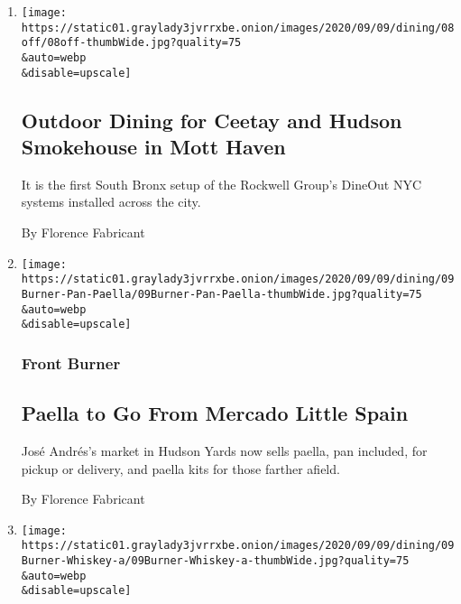\begin{enumerate}
\def\labelenumi{\arabic{enumi}.}
\item
  \href{/2020/09/08/dining/nyc-restaurant-news.html}{}

  \texttt{[image: https://static01.graylady3jvrrxbe.onion/images/2020/09/09/dining/08off/08off-thumbWide.jpg?quality=75\\\&auto=webp\\\&disable=upscale]}

  \hypertarget{outdoor-dining-for-ceetay-and-hudson-smokehouse-in-mott-haven}{%
  \subsection{Outdoor Dining for Ceetay and Hudson Smokehouse in Mott
  Haven}\label{outdoor-dining-for-ceetay-and-hudson-smokehouse-in-mott-haven}}

  It is the first South Bronx setup of the Rockwell Group's DineOut NYC
  systems installed across the city.

  By Florence Fabricant
\item
  \href{/2020/09/07/dining/paella-mercado-little-spain.html}{}

  \texttt{[image: https://static01.graylady3jvrrxbe.onion/images/2020/09/09/dining/09Burner-Pan-Paella/09Burner-Pan-Paella-thumbWide.jpg?quality=75\\\&auto=webp\\\&disable=upscale]}

  \hypertarget{front-burner}{%
  \subsubsection{Front Burner}\label{front-burner}}

  \hypertarget{paella-to-go-from-mercado-little-spain}{%
  \subsection{Paella to Go From Mercado Little
  Spain}\label{paella-to-go-from-mercado-little-spain}}

  José Andrés's market in Hudson Yards now sells paella, pan included,
  for pickup or delivery, and paella kits for those farther afield.

  By Florence Fabricant
\item
  \href{/2020/09/07/dining/kosher-whiskey.html}{}

  \texttt{[image: https://static01.graylady3jvrrxbe.onion/images/2020/09/09/dining/09Burner-Whiskey-a/09Burner-Whiskey-a-thumbWide.jpg?quality=75\\\&auto=webp\\\&disable=upscale]}


\end{enumerate}
